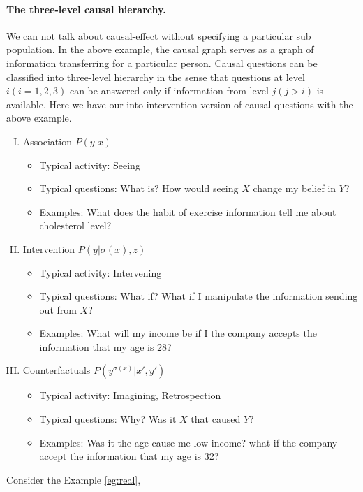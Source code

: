 \paragraph{The three-level causal hierarchy.}  We can not talk about causal-effect without specifying a particular sub population. In the above example, the causal graph serves as a graph of information transferring for a particular person. Causal questions can be classified into three-level hierarchy in the sense that questions at level $i(i=1, 2,3)$ can be answered only if information from level $j(j>i)$ is available. Here we have our into intervention version of causal questions with the above example.
\begin{enumerate}[I)]
	\setlength{\itemsep}{-1pt}
	\item Association $P(y|x)$
	\begin{itemize}
		\setlength{\itemsep}{0pt}		
		\item Typical activity: Seeing
		\item Typical questions: What is? How would seeing $X$ change my belief in $Y$?
		\item Examples: What does the habit of exercise information tell me about cholesterol level? 
	\end{itemize}
	\item Intervention $P(y|\sigma(x), z)$
	\begin{itemize}
		\setlength{\itemsep}{0pt}		
		\item Typical activity: Intervening
		\item Typical questions: What if?  What if I manipulate the information sending out from $X$?
		\item Examples: What will my income be if I the company accepts the information that my age is 28?
	\end{itemize}
	\item Counterfactuals $P(y^{\sigma(x)}|x', y')$
	\begin{itemize}
		\setlength{\itemsep}{0pt}		
		\item Typical activity: Imagining, Retrospection
		\item Typical questions: Why?  Was it $X$ that caused $Y$? 
		\item Examples: Was it the age cause me low income?  what if the company accept the information that my age is 32? 
	\end{itemize}
\end{enumerate}

Consider the Example \ref{eg:real},

